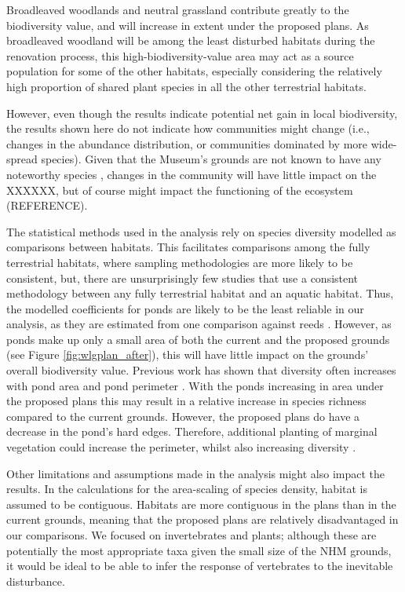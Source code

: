 Broadleaved woodlands and neutral grassland contribute greatly to the biodiversity value, and will increase in extent under the proposed plans. As broadleaved woodland will be among the least disturbed habitats during the renovation process, this high-biodiversity-value area may act as a source population for some of the other habitats, especially considering the relatively high proportion of shared plant species in all the other terrestrial habitats.

However, even though the results indicate potential net gain in local biodiversity, the results shown here do not indicate how communities might change (i.e., changes in the abundance distribution, or communities dominated by more wide-spread species). Given that the Museum's grounds are not known to have any noteworthy species \citep{ImpactAssessment:2015cf,PrelimEcoAppraisal:2015cf}, changes in the community will have little impact on the XXXXXX, but of course might impact the functioning of the ecosystem (REFERENCE).

The statistical methods used in the analysis rely on species diversity modelled as comparisons between habitats. This facilitates comparisons among the fully terrestrial habitats, where sampling methodologies are more likely to be consistent, but, there are unsurprisingly few studies that use a consistent methodology between any fully terrestrial habitat and an aquatic habitat. Thus, the modelled coefficients for ponds are likely to be the least reliable in our analysis, as they are estimated from one comparison against reeds \citep{Williams:2008hb}. However, as ponds make up only a small area of both the current and the proposed grounds (see Figure \ref{fig:wlgplan_after}), this will have little impact on the grounds' overall biodiversity value. Previous work has shown that diversity often increases with pond area \citep{Oertli:2002bc,Parris:2006jae} and pond perimeter \citep{Gagne:2007le,Gagne:2010ec}. With the ponds increasing in area under the proposed plans this may result in a relative increase in species richness compared to the current grounds. However, the proposed plans do have a decrease in the pond's hard edges. Therefore, additional planting of marginal vegetation could increase the perimeter, whilst also increasing diversity \citep{Williams:2008hb,Gioria:2010bc}.


Other limitations and assumptions made in the analysis might also impact the results. In the calculations for the area-scaling of species density, habitat is assumed to be contiguous. Habitats are more contiguous in the plans than in the current grounds, meaning that the proposed plans are relatively disadvantaged in our comparisons. We focused on invertebrates and plants; although these are potentially the most appropriate taxa given the small size of the NHM grounds, it would be ideal to be able to infer the response of vertebrates to the inevitable disturbance.

